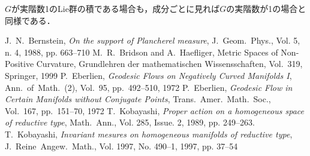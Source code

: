\documentclass[12pt,dvipdfmx,uplatex]{jsarticle}
\newcounter{countabst}
\newtheorem{thm-a}[countabst]{定理}
\newtheorem{def-a}[countabst]{定義}
\begin{document}
$G$が実階数1のLie群の積である場合も，成分ごとに見れば$G$の実階数が1の場合と同様である．

\clearpage
\begin{thebibliography}{99}
  \vspace{-0.5em}
 J.~N.~Bernstein, \textit{On the support of Plancherel measure}, J.~Geom.~Phys., Vol. 5, n. 4, 1988, pp. 663--710
 M.~R.~Bridson and A.~Haefliger, Metric Spaces of Non-Positive Curvature, Grundlehren der mathematischen Wissensschaften, Vol.~319, Springer, 1999
 P.~Eberlien, \textit{Geodesic Flows on Negatively Curved Manifolds I}, Ann.~of~Math.~(2), Vol.~95, pp.~492--510, 1972
 P.~Eberlien, \textit{Geodesic Flow in Certain Manifolds without Conjugate Points}, Trans.~Amer.~Math.~Soc., Vol.~167, pp.~151--70, 1972
 T.~Kobayashi, 
  \textit{Proper action on a homogeneous space of reductive type},
  Math.~Ann., Vol. 285, Issue. 2, 1989, pp. 249--263.  
 T.~Kobayashi, \textit{Invariant mesures on homogeneous manifolds of reductive type}, J.~Reine~Angew.~Math., Vol. 1997, No. 490--1, 1997, pp. 37--54

\end{thebibliography}


\begin{comment}
  \begin{def-a}{\cite[Definition~1.3]{e72-1}}\label{def:visibility}

  $M$が完備かつ非正曲率をもつ1-連結Riemann多様体であるとき，$M$をHadamard多様体といい，Hadamard多様体$M$が visibility manifold であるとは，任意の$ p\in M$と任意の$ \epsilon > 0$に対し，ある$r(p,\epsilon) >0 $が存在して，測地線$\gamma\colon [t_0, t_1]\to X $が$d_{M}(p, \gamma(t))\geq r(p,\epsilon) $，$t\in [t_0, t_1]$ならば，$\measuredangle_{p}(\gamma(t_0), \gamma(t_1)) \leq \epsilon $であることである．
\end{def-a}

\bluetext{$M$がvisibility manifold であるとは，幾何的に見れば}\footnote{図をつけようと思っています．2022/01/10}

\begin{thm-a}{\cite[p.~296, 9.33~Theorem]{bh99}, originally \cite[Theorem~4.1]{e72-2}}\label{thm:visibility-and-rank}
  
  ある$C\cptsub M$が存在して$ M = \bigcup\{f(C)\mid f\in \isom(M) \}  $なるHadamard多様体$M$に対し，次は同値である．
  \vspace{-1em}
  \begin{enumerate}
    \renewcommand{\labelenumi}{(\roman{enumi})}
  \item $M$はvisibility manifoldである．
  \item 全測地的な部分Riemann多様体$M'\subset M$で$\real^2$と等長同型なものが存在しない．
  \end{enumerate}
\end{thm-a}

ここでRiemann対称空間はHadamard多様体であり，\Cref{thm:visibility-and-rank}の (ii) は$G$の実階数が1以下であることと同値である．したがって$G$の実階数が1の場合$G/K$はvisibility manifoldであり，$G = \SU(1,2) $，$H= \SO(1,1)$の場合の証明と全く同様にして背理法により\Cref{yosou:1121}が示される．
\end{comment}
\end{document}
